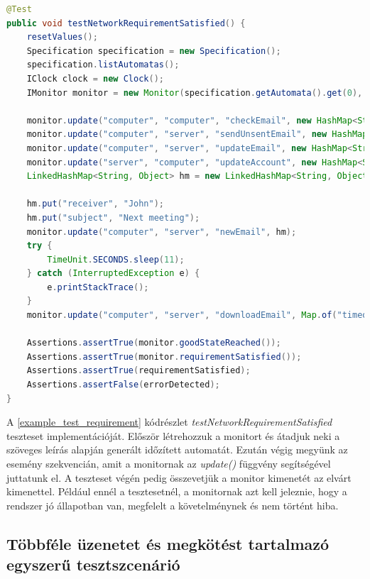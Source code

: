 \begin{lstlisting}[language=java, frame=single, float=ht!, caption={\textit{testNetworkRequirementSatisfied} teszteset.},captionpos=b,label=example_test_requirement]
@Test
public void testNetworkRequirementSatisfied() {
    resetValues();
    Specification specification = new Specification();
    specification.listAutomatas();
    IClock clock = new Clock();
    IMonitor monitor = new Monitor(specification.getAutomata().get(0), clock, this);
    
    monitor.update("computer", "computer", "checkEmail", new HashMap<String, Object>());
    monitor.update("computer", "server", "sendUnsentEmail", new HashMap<String, Object>());
    monitor.update("computer", "server", "updateEmail", new HashMap<String, Object>());
    monitor.update("server", "computer", "updateAccount", new HashMap<String, Object>());
    LinkedHashMap<String, Object> hm = new LinkedHashMap<String, Object>();

    hm.put("receiver", "John");
    hm.put("subject", "Next meeting");
    monitor.update("computer", "server", "newEmail", hm);
    try {
        TimeUnit.SECONDS.sleep(11);
    } catch (InterruptedException e) {
        e.printStackTrace();
    }
    monitor.update("computer", "server", "downloadEmail", Map.of("timeout", 10));
    
    Assertions.assertTrue(monitor.goodStateReached());
    Assertions.assertTrue(monitor.requirementSatisfied());
    Assertions.assertTrue(requirementSatisfied);
    Assertions.assertFalse(errorDetected);
}
\end{lstlisting}

A \ref{example_test_requirement} kódrészlet \textit{testNetworkRequirementSatisfied} teszteset implementációját.
Először létrehozzuk a monitort és átadjuk neki a szöveges leírás alapján generált időzített automatát.
Ezután végig megyünk az esemény szekvencián, amit a monitornak az \textit{update()} függvény segítségével juttatunk el.
A teszteset végén pedig összevetjük a monitor kimenetét az elvárt kimenettel.
Például ennél a tesztesetnél, a monitornak azt kell jeleznie, hogy a rendszer jó állapotban van, megfelelt a követelménynek és nem történt hiba.

\clearpage\subsection{Többféle üzenetet és megkötést tartalmazó egyszerű tesztszcenárió}

